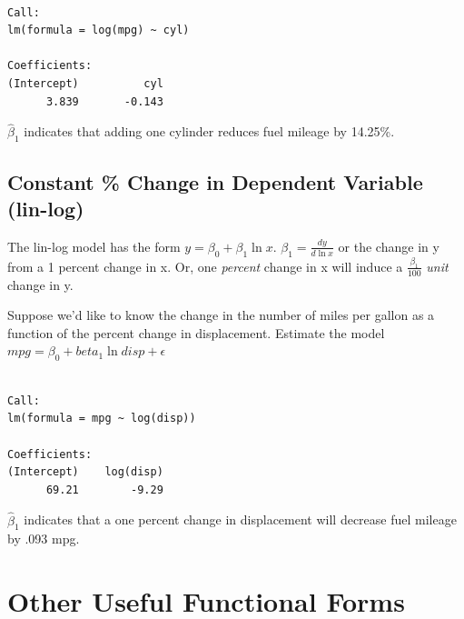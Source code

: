 \documentclass[]{book}
\newenvironment{Shaded}{\begin{snugshade}}{\end{snugshade}}
\newcommand{\KeywordTok}[1]{\textcolor[rgb]{0.13,0.29,0.53}{\textbf{#1}}}
\newcommand{\NormalTok}[1]{#1}
\newcommand{\OperatorTok}[1]{\textcolor[rgb]{0.81,0.36,0.00}{\textbf{#1}}}
\newcommand{\StringTok}[1]{\textcolor[rgb]{0.31,0.60,0.02}{#1}}
\begin{document}
\begin{verbatim}

Call:
lm(formula = log(mpg) ~ cyl)

Coefficients:
(Intercept)          cyl  
      3.839       -0.143  
\end{verbatim}

\(\hat\beta_1\) indicates that adding one cylinder reduces fuel mileage by 14.25\%.

\hypertarget{constant-change-in-dependent-variable-lin-log}{%
\subsection{Constant \% Change in Dependent Variable (lin-log)}\label{constant-change-in-dependent-variable-lin-log}}

The lin-log model has the form \(y=\beta_0+\beta_1\ln x\). \(\beta_1 = \frac{dy}{d\ln x}\) or the change in y from a 1 percent change in x. Or, one \emph{percent} change in x will induce a \(\frac{\beta_1}{100}\) \emph{unit} change in y.

Suppose we'd like to know the change in the number of miles per gallon as a function of the percent change in displacement. Estimate the model \(mpg=\beta_0+beta_1\ln disp+\epsilon\)

\begin{Shaded}
\end{Shaded}

\begin{verbatim}

Call:
lm(formula = mpg ~ log(disp))

Coefficients:
(Intercept)    log(disp)  
      69.21        -9.29  
\end{verbatim}

\(\hat\beta_1\) indicates that a one percent change in displacement will decrease fuel mileage by .093 mpg.

\hypertarget{other-useful-functional-forms}{%
\section{Other Useful Functional Forms}\label{other-useful-functional-forms}}
\end{document}
